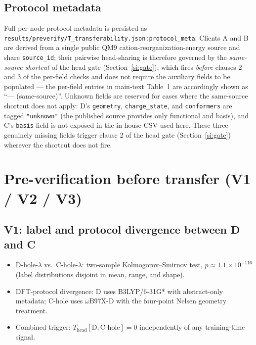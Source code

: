 \documentclass[11pt,a4paper]{article}
\begin{document}
\subsection{Protocol metadata}
\begin{sloppypar}
Full per-node protocol metadata is persisted as \texttt{results/preverify/T\_transferability.\linebreak[1]json:protocol\_meta}. Clients A and B are derived from a single public QM9 cation-reorganization-energy source and share \texttt{source\_id}; their pairwise head-sharing is therefore governed by the \emph{same-source shortcut} of the head gate (Section~\ref{si:gate}), which fires \emph{before} clauses 2 and 3 of the per-field checks and does not require the auxiliary fields to be populated --- the per-field entries in main-text Table~1 are accordingly shown as ``--- (same-source)''. Unknown fields are reserved for cases where the same-source shortcut does not apply: D's \texttt{geometry}, \texttt{charge\_state}, and \texttt{conformers} are tagged \texttt{"unknown"} (the published source provides only functional and basis), and C's \texttt{basis} field is not exposed in the in-house CSV used here. These three genuinely missing fields trigger clause 2 of the head gate (Section~\ref{si:gate}) wherever the shortcut does not fire.
\end{sloppypar}

\section{Pre-verification before transfer (V1 / V2 / V3)}\label{si:preverify}

\subsection{V1: label and protocol divergence between D and C}
\begin{itemize}
  \item D-hole-$\lambda$ vs.\ C-hole-$\lambda$: two-sample Kolmogorov--Smirnov test, $p \approx 1.1 \times 10^{-116}$ (label distributions disjoint in mean, range, and shape).
  \item DFT-protocol divergence: D uses B3LYP/6-31G* with abstract-only metadata; C-hole uses $\omega$B97X-D with the four-point Nelsen geometry treatment.
  \item Combined trigger: $T_{\mathrm{head}}[\mathrm{D}, \mathrm{C\text{-}hole}] = 0$ independently of any training-time signal.
\end{itemize}
\end{document}
